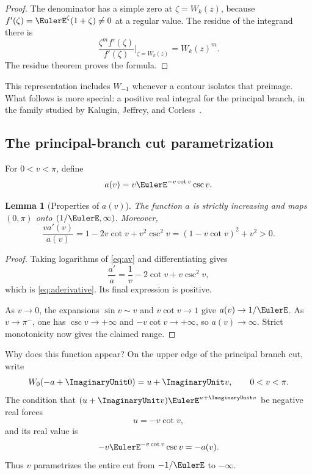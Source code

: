 \documentclass[11pt]{article}
\newtheorem{lemma}[lemma]{Lemma}
\theoremstyle{remark}
\begin{document}
\begin{proof}
The denominator has a simple zero at \(\zeta=W_k(z)\), because
\(f'(\zeta)=\EulerE^\zeta(1+\zeta)\neq0\) at a regular value.  The residue of the
integrand there is
\[
 \frac{\zeta^m f'(\zeta)}{f'(\zeta)}
 \bigg|_{\zeta=W_k(z)}
 =W_k(z)^m.
\]
The residue theorem proves the formula.
\end{proof}

This representation includes \(W_{-1}\) whenever a contour isolates that
preimage.  What follows is more special: a positive real integral for the principal
branch, in the family studied by Kalugin, Jeffrey, and
Corless~\cite{kalugin2012}.

\subsection{The principal-branch cut parametrization}

For \(0<v<\pi\), define
\begin{equation}\label{eq:av}
       a(v)=v\EulerE^{-v\cot v}\csc v.
\end{equation}

\begin{lemma}[Properties of \(a(v)\)]\label{lem:av}
The function \(a\) is strictly increasing and maps \((0,\pi)\) onto
\((1/\EulerE,\infty)\).  Moreover,
\begin{equation}\label{eq:aderivative}
 \frac{v a'(v)}{a(v)}
 =1-2v\cot v+v^2\csc^2v
 =(1-v\cot v)^2+v^2>0.
\end{equation}
\end{lemma}

\begin{proof}
Taking logarithms of \eqref{eq:av} and differentiating gives
\[
 \frac{a'}a=\frac1v-2\cot v+v\csc^2v,
\]
which is \eqref{eq:aderivative}.  Its final expression is positive.

As \(v\to0\), the expansions
\(\sin v\sim v\) and \(v\cot v\to1\) give \(a(v)\to1/\EulerE\).
As \(v\to\pi^-\), one has \(\csc v\to+\infty\) and
\(-v\cot v\to+\infty\), so \(a(v)\to\infty\).  Strict monotonicity now gives
the claimed range.
\end{proof}

Why does this function appear?  On the upper edge of the principal branch
cut, write
\[
       W_0(-a+\ImaginaryUnit0)=u+\ImaginaryUnit v,\qquad 0<v<\pi.
\]
The condition that \((u+\ImaginaryUnit v)\EulerE^{u+\ImaginaryUnit v}\) be negative real forces
\[
       u=-v\cot v,
\]
and its real value is
\[
       -v\EulerE^{-v\cot v}\csc v=-a(v).
\]
Thus \(v\) parametrizes the entire cut from \(-1/\EulerE\) to \(-\infty\).
\end{document}
